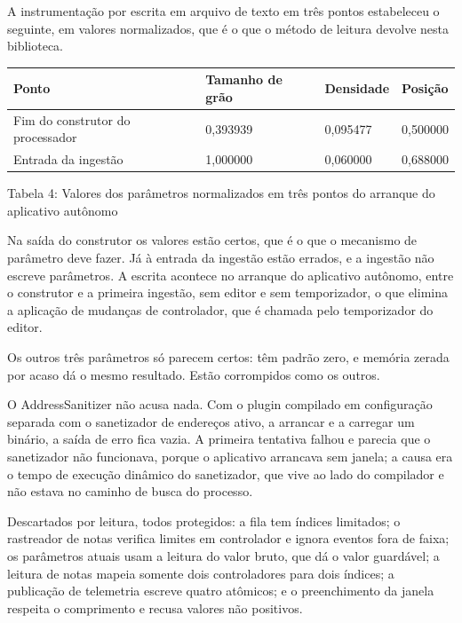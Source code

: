 \documentclass[12pt,a4paper]{article}
\begin{document}
A instrumentação por escrita em arquivo de texto em três pontos estabeleceu o seguinte, em valores normalizados, que é o que o método de leitura devolve nesta biblioteca.


\begin{center}
\footnotesize
\setlength{\tabcolsep}{4pt}
\begin{tabular}{p{}|p{}|p{}|p{}}
\hline
\textbf{Ponto} & \textbf{Tamanho de grão} & \textbf{Densidade} & \textbf{Posição} \\
\hline
Fim do construtor do processador & 0,393939 & 0,095477 & 0,500000 \\
Entrada da ingestão & 1,000000 & 0,060000 & 0,688000 \\
\hline
\end{tabular}
\end{center}
\noindent Tabela 4: Valores dos parâmetros normalizados em três pontos do arranque do aplicativo autônomo\par
\label{tab:4}
\vspace{2pt}{\footnotesize\noindent Elaborado pelos autores (2026).\par}

Na saída do construtor os valores estão certos, que é o que o mecanismo de parâmetro deve fazer. Já à entrada da ingestão estão errados, e a ingestão não escreve parâmetros. A escrita acontece no arranque do aplicativo autônomo, entre o construtor e a primeira ingestão, sem editor e sem temporizador, o que elimina a aplicação de mudanças de controlador, que é chamada pelo temporizador do editor.


Os outros três parâmetros só parecem certos: têm padrão zero, e memória zerada por acaso dá o mesmo resultado. Estão corrompidos como os outros.


O AddressSanitizer não acusa nada. Com o plugin compilado em configuração separada com o sanetizador de endereços ativo, a arrancar e a carregar um binário, a saída de erro fica vazia. A primeira tentativa falhou e parecia que o sanetizador não funcionava, porque o aplicativo arrancava sem janela; a causa era o tempo de execução dinâmico do sanetizador, que vive ao lado do compilador e não estava no caminho de busca do processo.


Descartados por leitura, todos protegidos: a fila tem índices limitados; o rastreador de notas verifica limites em controlador e ignora eventos fora de faixa; os parâmetros atuais usam a leitura do valor bruto, que dá o valor guardável; a leitura de notas mapeia somente dois controladores para dois índices; a publicação de telemetria escreve quatro atômicos; e o preenchimento da janela respeita o comprimento e recusa valores não positivos.
\end{document}
